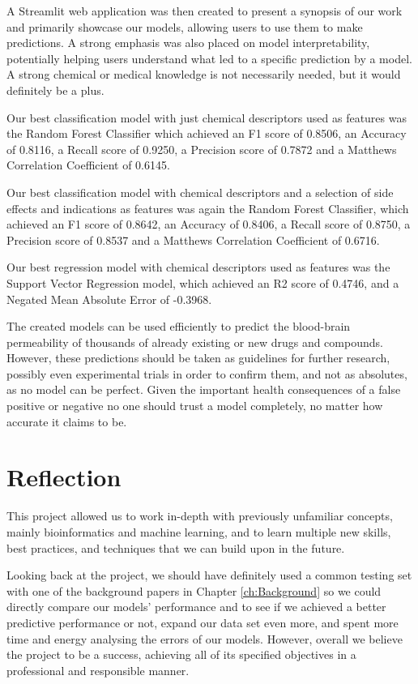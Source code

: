 A Streamlit web application was then created to present a synopsis of our work and primarily showcase our models, allowing users to use them to make predictions. A strong emphasis was also placed on model interpretability, potentially helping users understand what led to a specific prediction by a model. A strong chemical or medical knowledge is not necessarily needed, but it would definitely be a plus. 

Our best classification model with just chemical descriptors used as features was the Random Forest Classifier which achieved an F1 score of 0.8506, an Accuracy of 0.8116, a Recall score of 0.9250, a Precision score of 0.7872 and a Matthews Correlation Coefficient of 0.6145.

Our best classification model with chemical descriptors and a selection of side effects and indications as features was again the Random Forest Classifier, which achieved an F1 score of 0.8642, an Accuracy of 0.8406, a Recall score of 0.8750, a Precision score of 0.8537 and a Matthews Correlation Coefficient of 0.6716.

Our best regression model with chemical descriptors used as features was the Support Vector Regression model, which achieved an R2 score of 0.4746, and a Negated Mean Absolute Error of -0.3968.

The created models can be used efficiently to predict the blood-brain permeability of thousands of already existing or new drugs and compounds. However, these predictions should be taken as guidelines for further research, possibly even experimental trials in order to confirm them, and not as absolutes, as no model can be perfect. Given the important health consequences of a false positive or negative no one should trust a model completely, no matter how accurate it claims to be.

\section{Reflection}

This project allowed us to work in-depth with previously unfamiliar concepts, mainly bioinformatics and machine learning, and to learn multiple new skills, best practices, and techniques that we can build upon in the future. 

Looking back at the project, we should have definitely used a common testing set with one of the background papers in Chapter \ref{ch:Background} so we could directly compare our models' performance and to see if we achieved a better predictive performance or not, expand our data set even more, and spent more time and energy analysing the errors of our models. However, overall we believe the project to be a success, achieving all of its specified objectives in a professional and responsible manner.

